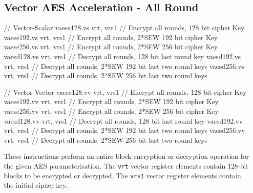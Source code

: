 \subsection{Vector AES Acceleration - All Round}
\label{sec:vector:aes:all-round}

\begin{cryptoisa}
// Vector-Scalar
vaese128.vs vrt, vrs1 // Encrypt all rounds,       128 bit cipher Key
vaese192.vs vrt, vrs1 // Encrypt all rounds, 2*SEW 192 bit cipher Key
vaese256.vs vrt, vrs1 // Encrypt all rounds, 2*SEW 256 bit cipher Key
vaesd128.vs vrt, vrs1 // Decrypt all rounds,       128 bit last     round key
vaesd192.vs vrt, vrs1 // Decrypt all rounds, 2*SEW 192 bit last two round keys
vaesd256.vs vrt, vrs1 // Decrypt all rounds, 2*SEW 256 bit last two round keys

// Vector-Vector
vaese128.vv vrt, vrs1 // Encrypt all rounds,       128 bit cipher Key
vaese192.vv vrt, vrs1 // Encrypt all rounds, 2*SEW 192 bit cipher Key
vaese256.vv vrt, vrs1 // Encrypt all rounds, 2*SEW 256 bit cipher Key
vaesd128.vv vrt, vrs1 // Decrypt all rounds,       128 bit last     round key
vaesd192.vv vrt, vrs1 // Decrypt all rounds, 2*SEW 192 bit last two round keys
vaesd256.vv vrt, vrs1 // Decrypt all rounds, 2*SEW 256 bit last two round keys
\end{cryptoisa}

These instructions perform an entire block encryption or decryption
operation for the given AES parameterisation.
The {\tt vrt} vector register elements contain $128$-bit blocks
to be encrypted or decrypted.
The {\tt vrs1} vector register elements contain the initial
cipher key.




